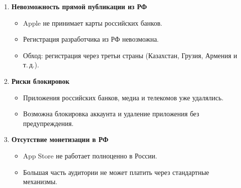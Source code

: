 \begin{enumerate}
    \item \textbf{Невозможность прямой публикации из РФ}
    \begin{itemize}
        \item Apple не принимает карты российских банков.
        \item Регистрация разработчика из РФ невозможна.
        \item Обход: регистрация через третьи страны (Казахстан, Грузия, Армения и т.\,д.).
    \end{itemize}

    \item \textbf{Риски блокировок}
    \begin{itemize}
        \item Приложения российских банков, медиа и телекомов уже удалялись.
        \item Возможна блокировка аккаунта и удаление приложения без предупреждения.
    \end{itemize}

    \item \textbf{Отсутствие монетизации в РФ}
    \begin{itemize}
        \item App Store не работает полноценно в России.
        \item Большая часть аудитории не может платить через стандартные механизмы.
    \end{itemize}

\end{enumerate}